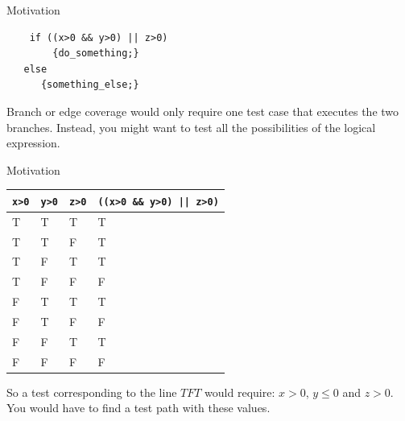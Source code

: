 \documentclass{beamer}
\begin{document}
\begin{frame}[fragile]{Motivation}
  \begin{lstlisting}
    if ((x>0 && y>0) || z>0) 
        {do_something;} 
   else 
      {something_else;}
  \end{lstlisting}
Branch or edge coverage would only require one test case that executes
the two branches. Instead, you might want to test all the possibilities
of the logical expression.


  
\end{frame}
\begin{frame}[fragile]{Motivation}
\begin{tabular}{|l|l|l|l|}
  \hline 
  {\tt x>0} & {\tt y>0} & {\tt z>0} & \verb+((x>0 && y>0) || z>0)+ \\ 
  \hline
  T & T & T & T \\
  T & T & F & T \\
  T & F & T & T \\
  T & F & F & F \\
  F & T & T & T \\
  F & T & F & F \\
  F & F & T & T \\
  F & F & F & F \\
  \hline 
\end{tabular}

So a test corresponding to the line $TFT$ would require:
$x>0$, $y\leq 0$ and $z>0$. \newline You would have to find a test path with
these values.
\end{frame}
\end{document}
